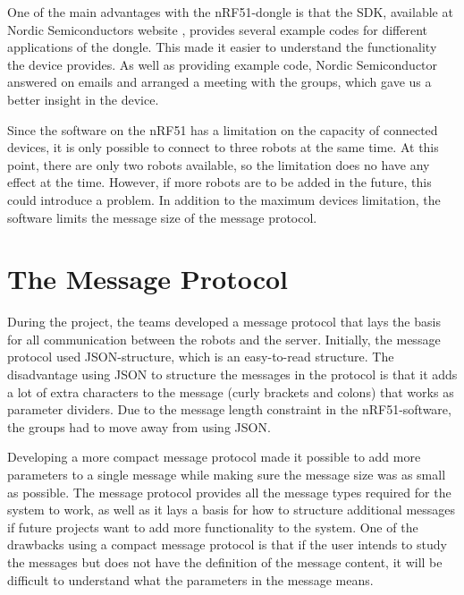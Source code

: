 One of the main advantages with the nRF51-dongle is that the SDK, available at Nordic Semiconductors website \cite{nrf51sdk}, provides several example codes for different applications of the dongle. This made it easier to understand the functionality the device provides. As well as providing example code, Nordic Semiconductor answered on emails and arranged a meeting with the groups, which gave us a better insight in the device.

Since the software on the nRF51 has a limitation on the capacity of connected devices, it is only possible to connect to three robots at the same time. At this point, there are only two robots available, so the limitation does no have any effect at the time. However, if more robots are to be added in the future, this could introduce a problem. In addition to the maximum devices limitation, the software limits the message size of the message protocol.

\section{The Message Protocol}
During the project, the teams developed a message protocol that lays the basis for all communication between the robots and the server. Initially, the message protocol used JSON-structure, which is an easy-to-read structure. The disadvantage using JSON to structure the messages in the protocol is that it adds a lot of extra characters to the message (curly brackets and colons) that works as parameter dividers. Due to the message length constraint in the nRF51-software, the groups had to move away from using JSON.

Developing a more compact message protocol made it possible to add more parameters to a single message while making sure the message size was as small as possible. The message protocol provides all the message types required for the system to work, as well as it lays a basis for how to structure additional messages if future projects want to add more functionality to the system. One of the drawbacks using a compact message protocol is that if the user intends to study the messages but does not have the definition of the message content, it will be difficult to understand what the parameters in the message means. 